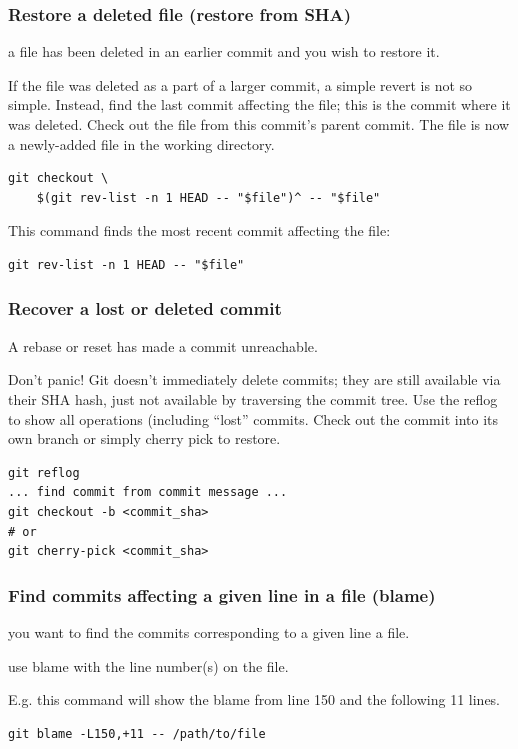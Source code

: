 \documentclass{git_course}
\begin{document}
\begin{frame}[fragile]
    \frametitle{Restore a deleted file (restore from SHA)}
     a file has been deleted in an earlier commit and you wish
    to restore it.

     If the file was deleted as a part of a larger commit, a
    simple revert is not so simple.  Instead, find the last commit affecting
    the file; this is the commit where it was deleted.  Check out the file
    from this commit's parent commit.  The file is now a newly-added file in
    the working directory.
\begin{lstlisting}
git checkout \
    $(git rev-list -n 1 HEAD -- "$file")^ -- "$file"
\end{lstlisting}

This command finds the most recent commit affecting the file:
\begin{lstlisting}
git rev-list -n 1 HEAD -- "$file"
\end{lstlisting}

\end{frame}

\begin{frame}[fragile]
    \frametitle{Recover a lost or deleted commit}
     A rebase or reset has made a commit unreachable.

     Don't panic! Git doesn't immediately delete commits;
    they are still available via their SHA hash, just not available by
    traversing the commit tree.  Use the reflog to show all operations
    (including ``lost'' commits.  Check out the commit into its own branch
    or simply cherry pick to restore.
\begin{lstlisting}
git reflog
... find commit from commit message ...
git checkout -b <commit_sha>
# or
git cherry-pick <commit_sha>
\end{lstlisting}

\end{frame}

\begin{frame}[fragile]
    \frametitle{Find commits affecting a given line in a file (blame)}

     you want to find the commits corresponding to a given
    line a file.

     use blame with the line number(s) on the file.

E.g. this command will show the blame from line 150 and the following 11 lines.
\begin{lstlisting}
git blame -L150,+11 -- /path/to/file
\end{lstlisting}

\end{frame}
\end{document}

